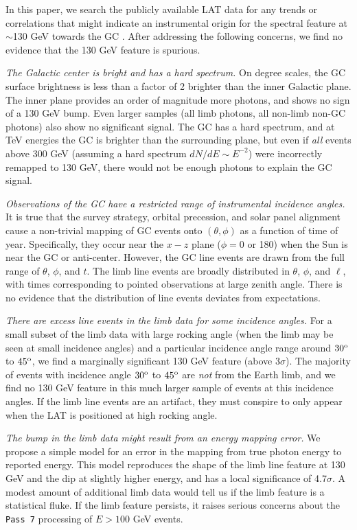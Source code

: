 \documentclass[aps,twocolumn,prd,superscriptaddress,showpacs,nofootinbib,fixfloat]{revtex4}
\newcommand{\degree}{^{\rm o}}
\begin{document}
In this paper, we search the publicly available LAT data for any trends or
correlations that might indicate an instrumental origin for the spectral
feature at $\sim$130 GeV towards the GC \citep{Weniger:2012,linepaper}. 
After addressing the following concerns, we find no evidence that the 130 GeV
feature is spurious. 
\medskip

\emph{The Galactic center is bright and has a hard spectrum.} On degree
scales, the GC surface brightness is less than a factor of 2 brighter than the
inner Galactic plane.  The inner plane provides an order of magnitude more
photons, and shows no sign of a 130 GeV bump.  Even larger samples (all limb
photons, all non-limb non-GC photons) also show no significant signal.  The GC has a hard
spectrum, and at TeV energies the
GC is brighter than the surrounding plane, but even if \emph{all} events above
300 GeV (assuming a hard spectrum $dN/dE\sim E^{-2}$) were incorrectly remapped
to 130 GeV, there would not be enough photons to explain the GC signal.

\emph{Observations of the GC have a restricted range of instrumental incidence
  angles.}  It is true that the survey strategy, orbital precession, and solar
panel alignment cause a non-trivial mapping of GC events onto $(\theta, \phi)$
as a function of time of year.  Specifically, they occur near the $x-z$ plane
($\phi=0$ or 180) when the Sun is near the GC or anti-center.  However, the GC
line events are drawn from the full range of $\theta$, $\phi$, and $t$.  The
limb line events are broadly distributed in $\theta$, $\phi$, and $\ell$, with
times corresponding to pointed observations at large zenith angle.  There is no
evidence that the distribution of line events deviates from expectations.

\emph{There are excess line events in the limb data for some incidence angles.}
For a small subset of the limb data with large rocking angle (when the limb may
be seen at small incidence angles) and a particular incidence angle range
around $30\degree$ to $45\degree$, we find a marginally significant 130 GeV feature
(above $3\sigma$).  
The majority of events with incidence angle $30\degree$ to
$45\degree$ are \emph{not} from the Earth limb, and we find no 130 GeV
feature in this much larger sample of events at this incidence angles.  If the
limb line events are an artifact, they must conspire to only appear when the
LAT is positioned at high rocking angle. 

\emph{The bump in the limb data might result from an energy mapping error.}
We propose a simple model for an error in the mapping from true photon energy
to reported energy.  This model reproduces the shape of the limb line feature
at 130 GeV and the dip at slightly higher energy, and has a local significance
of 4.7$\sigma$.  A modest amount of additional limb data would tell us if the
limb feature is a statistical fluke.  If the limb feature persists, it raises
serious concerns about the \texttt{Pass 7} processing of $E > 100$ GeV events.
\medskip
\end{document}
